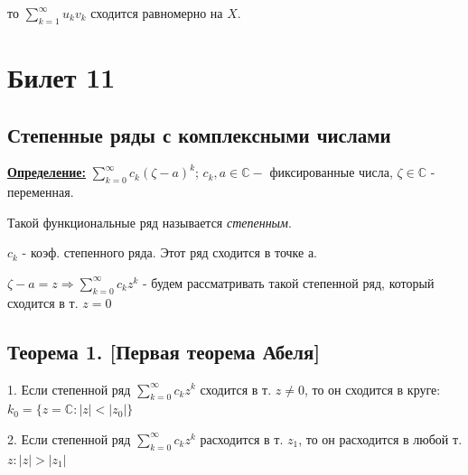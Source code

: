 \documentclass[a4paper,12pt]{article} %
\begin{document}
\hspace*{40 mm}то $\sum\limits_{k=1}^{\infty} u_k v_k$ сходится равномерно на $X$.



\newpage
\section{Билет 11}
	\subsection{Степенные ряды с комплексными числами}
	
	\underline{\textbf{Определение:}} $\sum\limits_{k = 0}^\infty c_k(\zeta - a)^k$; $c_k, a \in \mathbb{C} -$ фиксированные числа, $\zeta \in \mathbb{C}$  - переменная.
	
	Такой функциональные ряд называется \textit{степенным}.
	
	$c_k$ - коэф. степенного ряда. Этот ряд сходится в точке а.
	
	$\zeta - a = z \Rightarrow \sum\limits_{k = 0}^\infty c_k z^k$ - будем рассматривать такой степенной ряд, который сходится в т. $z = 0$
	
	\subsection{Теорема 1. [Первая теорема Абеля]}
	
	1. Если степенной ряд $\sum\limits_{k = 0}^\infty c_k z^k$ сходится в т. $z \neq 0$, то он сходится в круге: $k_0 = \{z = \mathbb{C}: |z| < |z_0|\}$
	
	2. Если степенной ряд $\sum\limits_{k = 0}^\infty c_k z^k$ расходится в т. $z_1$, то он расходится в любой т. $z: |z| > |z_1|$ 
	
\end{document}
